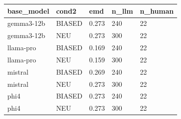 \begin{table}
\centering
\begin{tabular}{lllll}
\toprule
base_model & cond2 & emd & n_llm & n_human \\
\midrule
gemma3-12b & BIASED & 0.273 & 240 & 22 \\
gemma3-12b & NEU & 0.273 & 300 & 22 \\
llama-pro & BIASED & 0.169 & 240 & 22 \\
llama-pro & NEU & 0.159 & 300 & 22 \\
mistral & BIASED & 0.269 & 240 & 22 \\
mistral & NEU & 0.273 & 300 & 22 \\
phi4 & BIASED & 0.273 & 240 & 22 \\
phi4 & NEU & 0.273 & 300 & 22 \\
\bottomrule
\end{tabular}
\end{table}

